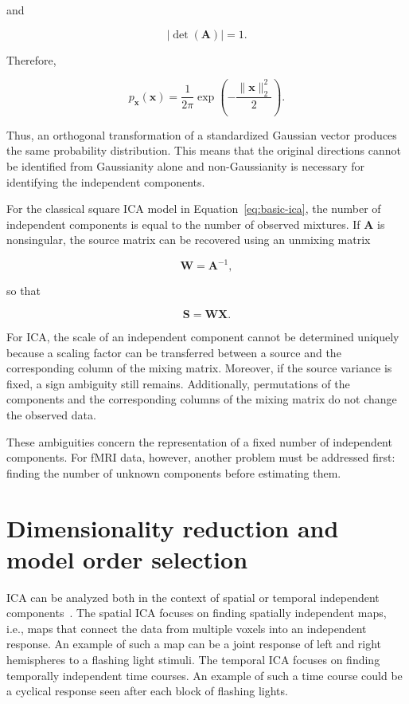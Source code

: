 \documentclass[english]{pwr_wmat_praca_dyplomowa}
\theoremstyle{definition}
\theoremstyle{remark}
\begin{document}
and

\begin{equation}
    |\det(\mathbf{A})|=1.
\end{equation}

Therefore,

\begin{equation}
    p_{\mathbf{x}}(\mathbf{x}) = \frac{1}{2\pi} \exp \left(-\frac{\|\mathbf{x}\|_2^2}{2}\right).
\end{equation}

Thus, an orthogonal transformation of a standardized Gaussian vector produces the same probability distribution. This means that the original directions cannot be identified from Gaussianity alone and non-Gaussianity is necessary for identifying the independent components.

For the classical square ICA model in Equation~\eqref{eq:basic-ica}, the number of independent components is equal to the number of observed mixtures. If $\mathbf{A}$ is nonsingular, the source matrix can be recovered using an unmixing matrix

\begin{equation}
    \mathbf{W} = \mathbf{A}^{-1},
\end{equation}

so that

\begin{equation}
    \mathbf{S} = \mathbf{W}\mathbf{X}.
\end{equation}

For ICA, the scale of an independent component cannot be determined uniquely because a scaling factor can be transferred between a source and the corresponding column of the mixing matrix. Moreover, if the source variance is fixed, a sign ambiguity still remains. Additionally, permutations of the components and the corresponding columns of the mixing matrix do not change the observed data.

These ambiguities concern the representation of a fixed number of independent components. For fMRI data, however, another problem must be addressed first: finding the number of unknown components before estimating them.

\section{Dimensionality reduction and model order selection}
\label{section:pica}

ICA can be analyzed both in the context of spatial or temporal independent components~\cite{spatial-temporal-ica}. The spatial ICA focuses on finding spatially independent maps, i.e., maps that connect the data from multiple voxels into an independent response. An example of such a map can be a joint response of left and right hemispheres to a flashing light stimuli. The temporal ICA focuses on finding temporally independent time courses. An example of such a time course could be a cyclical response seen after each block of flashing lights.
\end{document}
